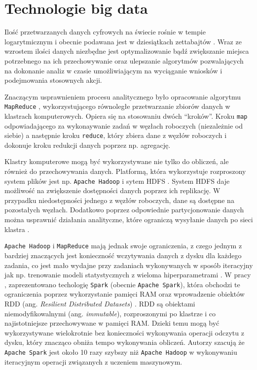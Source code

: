 \documentclass[
  letterpaper,
  DIV=11,
  numbers=noendperiod]{scrreprt}
\begin{document}
\hypertarget{technologie-big-data}{%
\section*{Technologie big data}\label{technologie-big-data}}


Ilość przetwarzanych danych cyfrowych na świecie rośnie w tempie
logarytmicznym i obecnie podawana jest w dziesiątkach zettabajtów
\autocite{bartley_2022}. Wraz ze wzrostem ilości danych niezbędne jest
optymalizowanie bądź zwiększanie miejsca potrzebnego na ich
przechowywanie oraz ulepszanie algorytmów pozwalających na dokonanie
analiz w czasie umożliwiającym na wyciąganie wniosków i podejmowania
stosownych akcji.

Znaczącym usprawnieniem procesu analitycznego było opracowanie algorytmu
\texttt{MapReduce} \autocite{dean_ghhemawat_2010}, wykorzystującego
równoległe przetwarzanie zbiorów danych w klastrach komputerowych.
Opiera się na stosowaniu dwóch ``kroków''. Kroku \texttt{map}
odpowiadającego za wykonaywanie zadań w węzłach roboczych (niezależnie
od siebie) a następnie kroku \texttt{reduce}, który zbiera dane z węzłów
roboczych i dokonuje kroku redukcji danych poprzez np. agregację.

Klastry komputerowe mogą być wykorzystywane nie tylko do obliczeń, ale
również do przechowywania danych. Platformą, która wykorzystuje
rozproszony system plików jest np. \texttt{Apache\ Hadoop} i sytem HDFS
\autocite{apache_hadoop}. System HDFS daje możliwość na zwiększenie
dostępności danych poprzez ich replikację. W przypadku niedostępności
jednego z węzłów roboczych, dane są dostępne na pozostałych węzłach.
Dodatkowo poprzez odpowiednie partycjonowanie danych można usprawnić
działania analityczne, które ograniczą wysyłanie danych po sieci klastra
\autocite{navarro_2017}.

\texttt{Apache\ Hadoop} i \texttt{MapReduce} mają jednak swoje
ograniczenia, z czego jednym z bardziej znaczących jest konieczność
wczytywania danych z dysku dla każdego zadania, co jest mało wydajne
przy zadaniach wykonywanych w sposób iteracyjny jak np. trenowanie
modeli statystycznych z wieloma hiperparametrami \autocite{spark_2010}.
W pracy \textcite{spark_2010}, zaprezentowano techologię \texttt{Spark}
(obecnie \texttt{Apache\ Spark}), która obchodzi te ograniczenia poprzez
wykorzystanie pamięci RAM oraz wprowadzenie obiektów RDD (ang.
\emph{Resilient Distributed Datasets}) \autocite{rdd_2012}. RDD są
obiektami niemodyfikowalnymi (ang. \emph{immutable}), rozproszonymi po
klastrze i co najistotniejsze przechowywane w pamięci RAM. Dzieki temu
mogą być wykorzystywane wielokrotnie bez konieczności wykonywania
operacji odczytu z dysku, który znacząco obniża tempo wykonywania
obliczeń. Autorzy \textcite{spark_2010} szacują że
\texttt{Apache\ Spark} jest około 10 razy szybszy niż
\texttt{Apache\ Hadoop} w wykonywaniu iteracyjnym operacji związanych z
uczeniem maszynowym.
\end{document}
